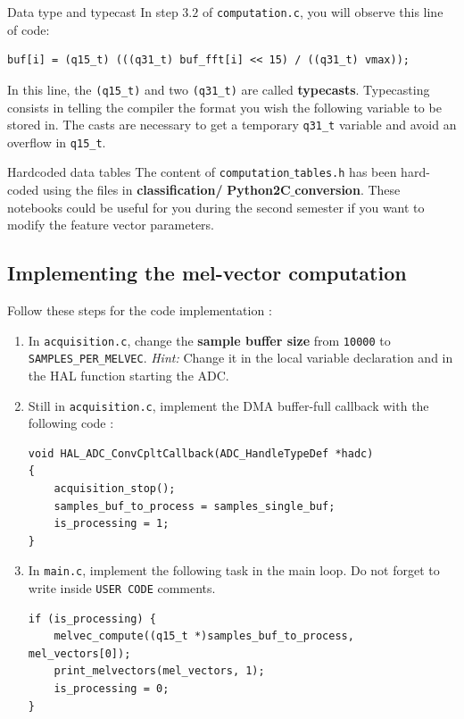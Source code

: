 \begin{bclogo}[couleur = gray!20, arrondi = 0.2, logo=\bcinfo]{Data type and typecast}
In step $3.2$ of \texttt{computation.c}, you will observe this line of code:
\begin{lstlisting}
buf[i] = (q15_t) (((q31_t) buf_fft[i] << 15) / ((q31_t) vmax));
\end{lstlisting}
In this line, the \texttt{(q15\_t)} and two \texttt{(q31\_t)} are called \textbf{typecasts}. Typecasting consists in telling the compiler the format you wish the following variable to be stored in. The casts are necessary to get a temporary \texttt{q31\_t} variable and avoid an overflow in \texttt{q15\_t}.
\end{bclogo}

\begin{bclogo}[couleur = gray!20, arrondi = 0.2, logo=\bcinfo]{Hardcoded data tables}
The content of \texttt{computation$\_$tables.h} has been hard-coded using the files in \textbf{classification/} \textbf{Python2C$\_$conversion}. These notebooks could be useful for you during the second semester if you want to modify the feature vector parameters.
\end{bclogo}

\subsection{Implementing the mel-vector computation}

Follow these steps for the code implementation :

\begin{enumerate}
\item In \texttt{acquisition.c}, change the \textbf{sample buffer size} from \texttt{10000} to \texttt{SAMPLES\_PER\_MELVEC}. \textit{Hint:} Change it in the local variable declaration and in the HAL function starting the ADC.
\item Still in \texttt{acquisition.c}, implement the DMA buffer-full callback with the following code :
\begin{lstlisting}
void HAL_ADC_ConvCpltCallback(ADC_HandleTypeDef *hadc)
{
    acquisition_stop();
    samples_buf_to_process = samples_single_buf;
    is_processing = 1;
}
\end{lstlisting}
\item In \texttt{main.c}, implement the following task in the main loop. Do not forget to write inside \texttt{USER CODE} comments.
\begin{lstlisting}
if (is_processing) {
    melvec_compute((q15_t *)samples_buf_to_process, mel_vectors[0]);
    print_melvectors(mel_vectors, 1);
    is_processing = 0;
}
\end{lstlisting}
\end{enumerate}

